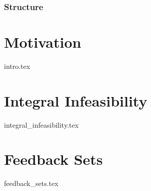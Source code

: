 \documentclass{beamer}
\begin{document}
    \begin{frame}
        \titlepage
    \end{frame}
    \begin{frame}
        \frametitle{Structure}
        \tableofcontents
    \end{frame}
    \section{Motivation}
    {intro.tex}

    \section{Integral Infeasibility}
    {integral_infeasibility.tex}

    \section{Feedback Sets}
    {feedback_sets.tex}
\end{document}

